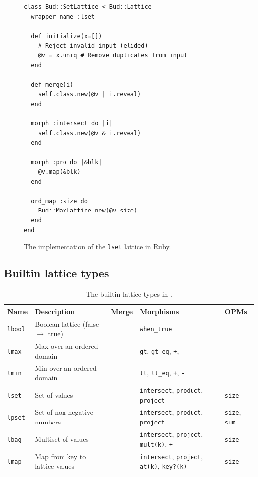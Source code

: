 \begin{figure}[t]
\begin{scriptsize}
\begin{lstlisting}
class Bud::SetLattice < Bud::Lattice
  wrapper_name :lset

  def initialize(x=[])
    # Reject invalid input (elided)
    @v = x.uniq # Remove duplicates from input
  end

  def merge(i)
    self.class.new(@v | i.reveal)
  end

  morph :intersect do |i|
    self.class.new(@v & i.reveal)
  end

  morph :pro do |&blk|
    @v.map(&blk)
  end

  ord_map :size do
    Bud::MaxLattice.new(@v.size)
  end
end
\end{lstlisting}
\end{scriptsize}
\caption{The implementation of the \texttt{lset} lattice in Ruby.}
\label{fig:lattice-set}
\end{figure}

\subsection{Builtin lattice types}
\label{sec:lattice-builtins}

\begin{table}[t]
\begin{tabular}{|l|l|l|l|l|}
\hline
\textbf{Name} & \textbf{Description} & \textbf{Merge} & \textbf{Morphisms} & \textbf{OPMs}\\
\hline
\texttt{lbool} & Boolean lattice (false $\to$ true) & & \texttt{when\_true} & \\
\texttt{lmax} & Max over an ordered domain & &\texttt{gt},
\texttt{gt\_eq}, \texttt{+}, \texttt{-} & \\
\texttt{lmin} & Min over an ordered domain & &\texttt{lt}, \texttt{lt\_eq},
\texttt{+}, \texttt{-} & \\
\texttt{lset} & Set of values & & \texttt{intersect}, \texttt{product},
\texttt{project} & \texttt{size} \\
\texttt{lpset} & Set of non-negative numbers & &
\texttt{intersect}, \texttt{product}, \texttt{project}& \texttt{size}, \texttt{sum} \\
\texttt{lbag} & Multiset of values & & \texttt{intersect},
\texttt{project}, \texttt{mult(k)}, \texttt{+} & \texttt{size}\\
\texttt{lmap} & Map from key to lattice values & &
\texttt{intersect}, \texttt{project}, \texttt{at(k)}, \texttt{key?(k)} & \texttt{size}\\
\hline
\end{tabular}
\caption{The builtin lattice types in \lang.}
\label{tbl:builtin-lattices}
\end{table}

